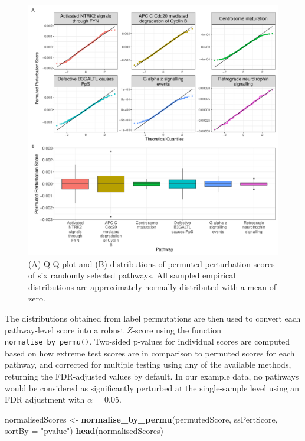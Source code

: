 \documentclass[9pt,a4paper,]{extarticle}
\newenvironment{Shaded}{\begin{snugshade}}{\end{snugshade}}
\newcommand{\AttributeTok}[1]{\textcolor[rgb]{0.13,0.29,0.53}{#1}}
\newcommand{\FunctionTok}[1]{\textcolor[rgb]{0.13,0.29,0.53}{\textbf{#1}}}
\newcommand{\NormalTok}[1]{#1}
\newcommand{\OtherTok}[1]{\textcolor[rgb]{0.56,0.35,0.01}{#1}}
\newcommand{\StringTok}[1]{\textcolor[rgb]{0.31,0.60,0.02}{#1}}
\begin{document}
\begin{figure}

{\centering \includegraphics[width=1\linewidth]{sSNAPPY_paper_files/figure-latex/Figure3-1} 

}

\caption{(A) Q-Q plot and (B) distributions of permuted perturbation scores of six randomly selected pathways. All sampled empirical distributions are approximately normally distributed with a mean of zero.}\label{fig:Figure3}
\end{figure}

The distributions obtained from label permutations are then used to convert each pathway-level score into a robust \(Z\)-score using the function \texttt{normalise\_by\_permu()}.
Two-sided p-values for individual scores are computed based on how extreme test scores are in comparison to permuted scores for each pathway, and corrected for multiple testing using any of the available methods, returning the FDR-adjusted values by default.
In our example data, no pathways would be considered as significantly perturbed at the single-sample level using an FDR adjustment with \(\alpha\) = 0.05.

\begin{Shaded}
\begin{Highlighting}[]
\NormalTok{normalisedScores }\OtherTok{\textless{}{-}} \FunctionTok{normalise\_by\_permu}\NormalTok{(permutedScore, ssPertScore, }
                                       \AttributeTok{sortBy =} \StringTok{"pvalue"}\NormalTok{)}
\FunctionTok{head}\NormalTok{(normalisedScores)}
\end{Highlighting}
\end{Shaded}
\end{document}
